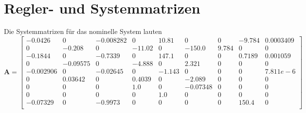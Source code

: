 \chapter{Regler- und Systemmatrizen}\label{app:matrizen}
Die Systemmatrizen für das nominelle System lauten
\begin{equation*}
\textbf{A} = \begin{bmatrix} 
-0.0426 & 0 & -0.008282 & 0 & 10.81 & 0 & 0 & -9.784 & 0.0003409\\ 
0 & -0.208 & 0 & -11.02 & 0 & -150.0 & 9.784 & 0 & 0\\
-0.1844 & 0 & -0.7339 & 0 & 147.1 & 0 & 0 & 0.7189 & 0.001059\\
0 & -0.09575 & 0 & -4.888 & 0 & 2.321 & 0 & 0 & 0\\
-0.002906 & 0 & -0.02645 & 0 & -1.143 & 0 & 0 & 0 & 7.811e-6\\
0 & 0.03642 & 0 & 0.4039 & 0 & -2.089 & 0 & 0 & 0\\
0 & 0 & 0 & 1.0 & 0 & -0.07348 & 0 & 0 & 0\\ 
0 & 0 & 0 & 0 & 1.0 & 0 & 0 & 0 & 0\\ 
-0.07329 & 0 & -0.9973 & 0 & 0 & 0 & 0 & 150.4 & 0 \\
\end{bmatrix}
\end{equation*}

